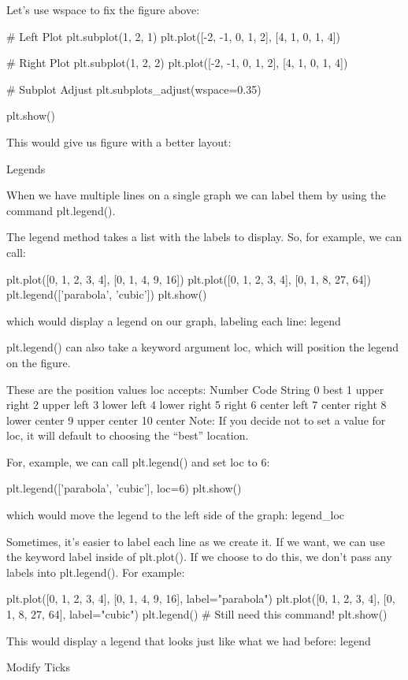 \documentclass{journal}
\begin{document}
Let’s use wspace to fix the figure above:

# Left Plot
plt.subplot(1, 2, 1)
plt.plot([-2, -1, 0, 1, 2], [4, 1, 0, 1, 4])

# Right Plot
plt.subplot(1, 2, 2)
plt.plot([-2, -1, 0, 1, 2], [4, 1, 0, 1, 4])

# Subplot Adjust
plt.subplots_adjust(wspace=0.35)

plt.show()

This would give us figure with a better layout:

Legends

When we have multiple lines on a single graph we can label them by using the command plt.legend().

The legend method takes a list with the labels to display. So, for example, we can call:

plt.plot([0, 1, 2, 3, 4], [0, 1, 4, 9, 16])
plt.plot([0, 1, 2, 3, 4], [0, 1, 8, 27, 64])
plt.legend(['parabola', 'cubic'])
plt.show()

which would display a legend on our graph, labeling each line: legend

plt.legend() can also take a keyword argument loc, which will position the legend on the figure.

These are the position values loc accepts:
Number Code 	String
0 	best
1 	upper right
2 	upper left
3 	lower left
4 	lower right
5 	right
6 	center left
7 	center right
8 	lower center
9 	upper center
10 	center
Note: If you decide not to set a value for loc, it will default to choosing the “best” location. 	

For, example, we can call plt.legend() and set loc to 6:

plt.legend(['parabola', 'cubic'], loc=6)
plt.show()

which would move the legend to the left side of the graph: legend_loc

Sometimes, it’s easier to label each line as we create it. If we want, we can use the keyword label inside of plt.plot(). If we choose to do this, we don’t pass any labels into plt.legend(). For example:

plt.plot([0, 1, 2, 3, 4], [0, 1, 4, 9, 16],
         label="parabola")
plt.plot([0, 1, 2, 3, 4], [0, 1, 8, 27, 64],
         label="cubic")
plt.legend() # Still need this command!
plt.show()

This would display a legend that looks just like what we had before: legend


Modify Ticks
\end{document}

